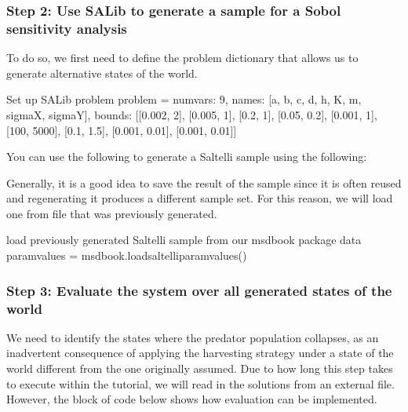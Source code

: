 \documentclass[letterpaper,10pt,english]{book}
\begin{document}
\subsubsection{Step 2: Use SALib to generate a sample for a Sobol sensitivity analysis}
\label{\detokenize{A2_Jupyter_Notebooks:step-2-use-salib-to-generate-a-sample-for-a-sobol-sensitivity-analysis}}
\sphinxAtStartPar
To do so, we first need to define the problem dictionary that allows us
to generate alternative states of the world.

\begin{sphinxVerbatim}[commandchars=\\\{\}]
\PYGZsh{} Set up SALib problem
problem = \PYGZob{}
  \PYGZsq{}num\PYGZus{}vars\PYGZsq{}: 9,
  \PYGZsq{}names\PYGZsq{}: [\PYGZsq{}a\PYGZsq{}, \PYGZsq{}b\PYGZsq{}, \PYGZsq{}c\PYGZsq{}, \PYGZsq{}d\PYGZsq{}, \PYGZsq{}h\PYGZsq{}, \PYGZsq{}K\PYGZsq{}, \PYGZsq{}m\PYGZsq{}, \PYGZsq{}sigmaX\PYGZsq{}, \PYGZsq{}sigmaY\PYGZsq{}],
  \PYGZsq{}bounds\PYGZsq{}: [[0.002, 2], [0.005, 1], [0.2, 1], [0.05, 0.2], [0.001, 1],
             [100, 5000], [0.1, 1.5], [0.001, 0.01], [0.001, 0.01]]
\PYGZcb{}
\end{sphinxVerbatim}

\sphinxAtStartPar
You can use the following to generate a Saltelli sample using the
following:

\begin{sphinxVerbatim}[commandchars=\\\{\}]
    
\end{sphinxVerbatim}

\sphinxAtStartPar
Generally, it is a good idea to save the result of the sample since it
is often reused and regenerating it produces a different sample set. For
this reason, we will load one from file that was previously generated.

\begin{sphinxVerbatim}[commandchars=\\\{\}]
\PYGZsh{} load previously generated Saltelli sample from our msdbook package data
param\PYGZus{}values = msdbook.load\PYGZus{}saltelli\PYGZus{}param\PYGZus{}values()
\end{sphinxVerbatim}


\subsubsection{Step 3: Evaluate the system over all generated states of the world}
\label{\detokenize{A2_Jupyter_Notebooks:step-3-evaluate-the-system-over-all-generated-states-of-the-world}}
\sphinxAtStartPar
We need to identify the states where the predator population collapses,
as an inadvertent consequence of applying the harvesting strategy under
a state of the world different from the one originally assumed. Due to
how long this step takes to execute within the tutorial, we will read in
the solutions from an external file. However, the block of code below
shows how evaluation can be implemented.
\end{document}
